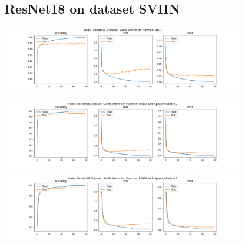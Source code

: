 \documentclass[a4paper]{article}
\begin{document}
		\subsection{ResNet18 on dataset SVHN}
			\begin{center}
				\centering
				\includegraphics[width=400px,keepaspectratio]{Results/ResNet18_SVHN_ReLU.png}
			\end{center}
			\begin{center}
				\centering
				\includegraphics[width=400px,keepaspectratio]{Results/ResNet18_SVHN_k-WTA_0.2.png}
			\end{center}
			\begin{center}
				\centering
				\includegraphics[width=400px,keepaspectratio]{Results/ResNet18_SVHN_k-WTA_0.1.png}
			\end{center}
		
\end{document}
